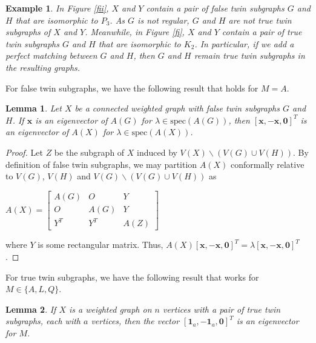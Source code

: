 \documentclass[11pt]{article}
\newtheorem{lemma}{Lemma}
\newtheorem{example}{Example}
\newcommand{\bx}{\mathbf x}
\newcommand{\one}{\mathbf 1}
\newcommand{\zero}{\mathbf 0}
\newcommand\spec{{\mathrm{spec}}}
\begin{document}
\begin{example}
In Figure \ref{fii}, $X$ and $Y$ contain a pair of false twin subgraphs $G$ and $H$ that are isomorphic to $P_3$. As $G$ is not regular, $G$ and $H$ are not true twin subgraphs of $X$ and $Y$. Meanwhile, in Figure \ref{fi}, $X$ and $Y$ contain a pair of true twin subgraphs $G$ and $H$ that are isomorphic to $K_2$. In particular, if we add a perfect matching between $G$ and $H$, then $G$ and $H$ remain true twin subgraphs in the resulting graphs.
\end{example}

For false twin subgraphs, we have the following result that holds for $M=A$.

\begin{lemma}
\label{lem:x-x}
Let $X$ be a connected weighted graph with false twin subgraphs $G$ and $H$. If $\bx$ is an eigenvector of $A(G)$ for $\lambda\in\spec(A(G))$, then $[\bx,-\bx,\zero]^T$ is an eigenvector of $A(X)$ for $\lambda\in\spec(A(X))$.
\end{lemma}

\begin{proof}
Let $Z$ be the subgraph of $X$ induced by $V(X)\backslash (V(G)\cup V(H))$. By definition of false twin subgraphs, we may partition $A(X)$ conformally relative to $V(G)$, $V(H)$ and $V(G)\backslash (V(G)\cup V(H))$ as
\begin{center}
$A(X)=\begin{bmatrix}A(G)&O&Y \\  O&A(G)&Y\\ Y^T&Y^T&A(Z)\end{bmatrix}$
\end{center}
where $Y$ is some rectangular matrix. Thus, $A(X)[\bx,-\bx,\zero]^T=\lambda[\bx,-\bx,\zero]^T$.
\end{proof}

For true twin subgraphs, we have the following result that works for $M\in\{A,L,Q\}$.

\begin{lemma}
\label{1-10}
If $X$ is a weighted graph on $n$ vertices with a pair of true twin subgraphs, each with $a$ vertices, then the vector $[\one_a ,-\one_a ,\zero]^T$ is an eigenvector for $M$.
\end{lemma}
\end{document}
